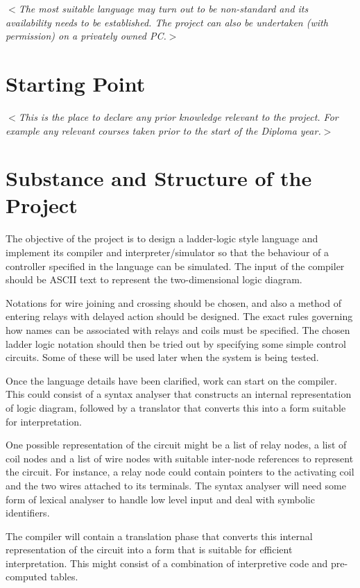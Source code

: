\documentclass[12pt]{article}
\newcommand{\al}{$<$}
\newcommand{\ar}{$>$}
\begin{document}
\al\emph{The most suitable language may turn out to be non-standard and
  its availability needs to be established.  The project can also be
  undertaken (with permission) on a privately owned PC.}\ar


\section*{Starting Point}

\al\emph{This is the place to declare any prior knowledge relevant to
  the project.  For example any relevant courses taken prior to the
  start of the Diploma year.}\ar


\section*{Substance and Structure of the Project}

The objective of the project is to design a ladder-logic style
language and implement its compiler and interpreter/simulator so that
the behaviour of a controller specified in the language can be
simulated.  The input of the compiler should be ASCII text to
represent the two-dimensional logic diagram.

Notations for wire joining and crossing should be chosen, and also a
method of entering relays with delayed action should be designed. The
exact rules governing how names can be associated with relays and
coils must be specified. The chosen ladder logic notation should then
be tried out by specifying some simple control circuits. Some of these
will be used later when the system is being tested.

Once the language details have been clarified, work can start on the
compiler.  This could consist of a syntax analyser that constructs an
internal representation of logic diagram, followed by a translator
that converts this into a form suitable for interpretation.

One possible representation of the circuit might be a list of relay
nodes, a list of coil nodes and a list of wire nodes with suitable
inter-node references to represent the circuit. For instance, a relay
node could contain pointers to the activating coil and the two wires
attached to its terminals. The syntax analyser will need some form of
lexical analyser to handle low level input and deal with symbolic
identifiers.

The compiler will contain a translation phase that converts this
internal representation of the circuit into a form that is suitable
for efficient interpretation.  This might consist of a combination of
interpretive code and pre-computed tables.
\end{document}
